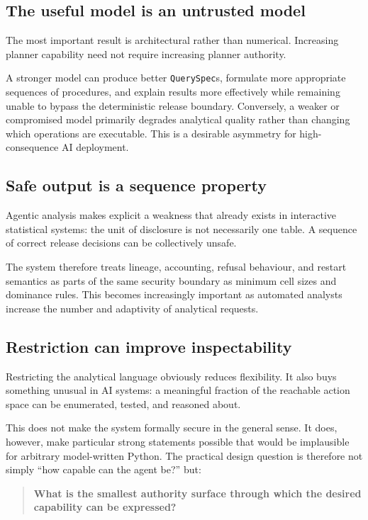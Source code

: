 \documentclass[11pt,a4paper]{article}
\begin{document}
\subsection{The useful model is an untrusted model}

The most important result is architectural rather than numerical. Increasing
planner capability need not require increasing planner authority.

A stronger model can produce better \texttt{QuerySpec}s, formulate more
appropriate sequences of procedures, and explain results more effectively while
remaining unable to bypass the deterministic release boundary. Conversely, a
weaker or compromised model primarily degrades analytical quality rather than
changing which operations are executable. This is a desirable asymmetry for
high-consequence AI deployment.

\subsection{Safe output is a sequence property}

Agentic analysis makes explicit a weakness that already exists in interactive
statistical systems: the unit of disclosure is not necessarily one table. A
sequence of correct release decisions can be collectively unsafe.

The system therefore treats lineage, accounting, refusal behaviour, and restart
semantics as parts of the same security boundary as minimum cell sizes and
dominance rules. This becomes increasingly important as automated analysts
increase the number and adaptivity of analytical requests.

\subsection{Restriction can improve inspectability}

Restricting the analytical language obviously reduces flexibility. It also buys
something unusual in AI systems: a meaningful fraction of the reachable action
space can be enumerated, tested, and reasoned about.

This does not make the system formally secure in the general sense. It does,
however, make particular strong statements possible that would be implausible
for arbitrary model-written Python. The practical design question is therefore
not simply ``how capable can the agent be?'' but:

\begin{quote}
\textbf{What is the smallest authority surface through which the desired
capability can be expressed?}
\end{quote}
\end{document}
